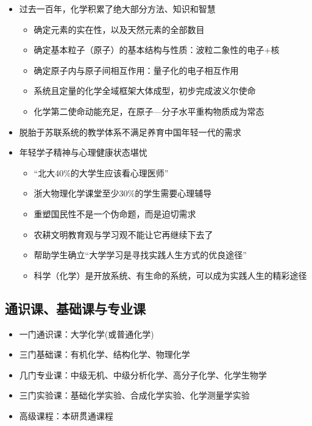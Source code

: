 \documentclass[cn,hazy,blue,12pt,normal]{mynote}
\begin{document}
\begin{itemize}
  \item 过去一百年，化学积累了绝大部分方法、知识和智慧
    \begin{itemize}
        \item 确定元素的实在性，以及天然元素的全部数目
        \item 确定基本粒子（原子）的基本结构与性质：波粒二象性的电子+核
        \item 确定原子内与原子间相互作用：量子化的电子相互作用
        \item 系统且定量的化学全域框架大体成型，初步完成波义尔使命
        \item 化学第二使命动能充足，在原子---分子水平重构物质成为常态
    \end{itemize}
  \item 脱胎于苏联系统的教学体系不满足养育中国年轻一代的需求
  \item 年轻学子精神与心理健康状态堪忧
    \begin{itemize}
      \item “北大40\%的大学生应该看心理医师”
      \item 浙大物理化学课堂至少30\%的学生需要心理辅导
      \item 重塑国民性不是一个伪命题，而是迫切需求
      \item 农耕文明教育观与学习观不能让它再继续下去了
      \item 帮助学生确立“大学学习是寻找实践人生方式的优良途径”
      \item 科学（化学）是开放系统、有生命的系统，可以成为实践人生的精彩途径
    \end{itemize}
\end{itemize}

\subsection{通识课、基础课与专业课}

\begin{itemize}
  \item 一门通识课：大学化学(或普通化学)
  \item 三门基础课：有机化学、结构化学、物理化学
  \item 几门专业课：中级无机、中级分析化学、高分子化学、化学生物学
  \item 三门实验课：基础化学实验、合成化学实验、化学测量学实验
  \item 高级课程：本研贯通课程
\end{itemize}
\end{document}
